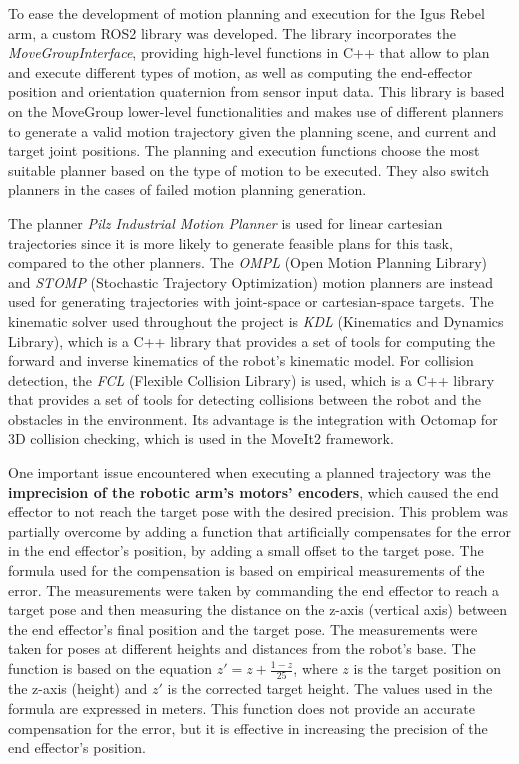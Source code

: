 To ease the development of motion planning and execution for the Igus Rebel arm, a custom ROS2 library was developed.
The library incorporates the \textit{MoveGroupInterface}, providing high-level functions
in C++ that allow to plan and execute different types of motion, as well as computing the end-effector position
and orientation quaternion from sensor input data. This library is based on the MoveGroup lower-level functionalities 
and makes use of different planners to generate a valid motion trajectory given the planning scene, and current and target
joint positions. The planning and execution functions choose the most suitable planner based on the type of motion
to be executed. They also switch planners in the cases of failed motion planning generation.

The planner \textit{Pilz Industrial Motion Planner} is used for linear cartesian trajectories 
since it is more likely to generate feasible plans for this task, compared to the other planners.
The \textit{OMPL} (Open Motion Planning Library) and
\textit{STOMP} (Stochastic Trajectory Optimization) motion planners
are instead used for generating trajectories with joint-space or cartesian-space targets.
The kinematic solver used throughout the project is \textit{KDL} (Kinematics and Dynamics Library), which is a C++ library
that provides a set of tools for computing the forward and inverse kinematics of the robot's kinematic model.
For collision detection, the \textit{FCL} (Flexible Collision Library) is used, which is a C++ library that provides
a set of tools for detecting collisions between the robot and the obstacles in the environment.
Its advantage is the integration with Octomap for 3D collision checking, which is used in the MoveIt2 framework.

One important issue encountered when executing a planned trajectory was the
\textbf{imprecision of the robotic arm's motors' encoders}, which caused the end effector
to not reach the target pose with the desired precision. This problem was partially overcome by adding a function
that artificially compensates for the error in the end effector's position, by adding a small offset 
to the target pose. The formula used for the compensation is based on empirical measurements of the error.
The measurements were taken by commanding the end effector to reach a target pose and then measuring the distance
on the z-axis (vertical axis) between the end effector's final position and the target pose.
The measurements were taken for poses at different heights and distances from the robot's base.
The function is based on the equation 
$z' = z + \frac{1 - z}{25}$, where $z$ is the target position on the z-axis (height) and $z'$ is the corrected target height.
The values used in the formula are expressed in meters.
This function does not provide an accurate compensation for the error, but it is effective in increasing the precision
of the end effector's position.


